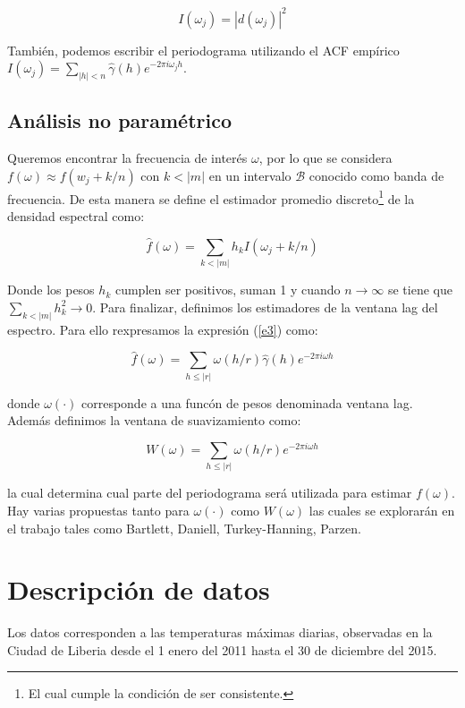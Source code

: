 \documentclass[a4paper,10pt]{article}
\begin{document}
$$I(\omega_j)= |d(\omega_j)|^2$$

\noindent Tambi\'en, podemos escribir el periodograma utilizando el ACF emp\'irico $I(\omega_j)=\sum_{|h|<n} \hat{\gamma}(h) e^{-2 \pi i \omega_j h}$.

\subsection{An\'alisis no param\'etrico}

\noindent Queremos encontrar la frecuencia de inter\'es $\omega$, por lo que se considera $f(\omega) \approx f(w_j + k/n)$ con $k<|m|$ en un intervalo $\mathcal{B}$ conocido como banda de frecuencia. De esta manera se define el estimador promedio discreto\footnote{El cual cumple la condici\'on de ser consistente.} de la densidad espectral como:

\begin{equation}\label{e3}
\hat{f}(\omega)= \sum_{k<|m|} h_k I(\omega_j +k/n)
\end{equation}

\noindent Donde los pesos $h_k$ cumplen ser positivos, suman 1 y cuando $n \rightarrow \infty$ se tiene que $\sum_{k<|m|} h_k^2 \rightarrow 0$. Para finalizar, definimos los estimadores de la ventana lag del espectro. Para ello rexpresamos la expresi\'on (\ref{e3}) como:

$$ \hat{f}(\omega)=  \displaystyle{\sum_{h \leq |r|} \omega(h/r) \hat{\gamma}(h)e^{-2 \pi i \omega h} }$$

\noindent donde $\omega(\cdot)$ corresponde a una func\'on de pesos denominada ventana lag. Adem\'as definimos la ventana de suavizamiento como:

$$ W(\omega)=  \displaystyle{\sum_{h \leq |r|} \omega(h/r)e^{-2 \pi i \omega h} }$$

\noindent la cual determina cual parte del periodograma  ser\'a utilizada para estimar $f(\omega)$. Hay varias propuestas tanto para $\omega(\cdot)$ como $W(\omega)$ las cuales se explorar\'an en el trabajo tales como Bartlett, Daniell, Turkey-Hanning, Parzen.

\section{Descripci\'on de datos}
	
\noindent Los datos corresponden a las temperaturas m\'aximas diarias, observadas en la Ciudad de Liberia desde el 1 enero del 2011 hasta el 30 de diciembre del 2015.
	
\end{document}
